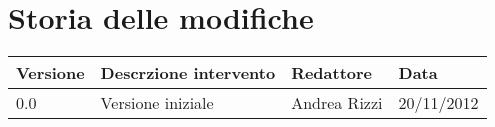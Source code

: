 %

\newcommand{\docName}{Analisi dei requisiti}
\newcommand{\docFileName}{ar.tex}
\newcommand{\docVers}{0.0}
\newcommand{\creationDate}{20/11/2012}
\newcommand{\modificationDate}{20/11/2012}
\newcommand{\docState}{}
\newcommand{\docUsage}{Esterno}
\newcommand{\docAuthors}{}
\newcommand{\approvedBy}{}
\newcommand{\verifiedBy}{}
\newcommand{\docRoot}{..}
\def\INDICETABELLE{false}
\def\INDICEFIGURE{false}








\section*{Storia delle modifiche}
\begin{tabularx}{\textwidth}{lXll}
\toprule
Versione & Descrzione intervento & Redattore & Data\\
\midrule %
0.0 & Versione iniziale & Andrea Rizzi & 20/11/2012\\
\bottomrule
\end{tabularx}
\newpage


